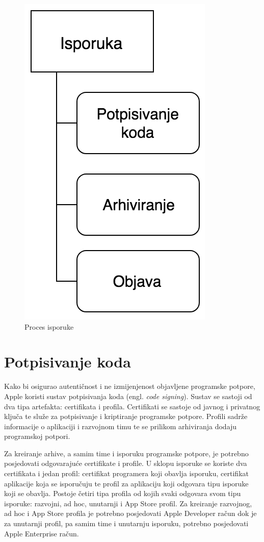 \documentclass[times, utf8, diplomski, numeric]{fer}
\newcommand{\eng}[1]{(engl. \textit{#1})}
\begin{document}
\begin{figure}
\centering
\includegraphics[scale=0.6]{ContinuousDelivery}
\caption{Proces isporuke}
\label{fig:ContinuousDelivery}
\end{figure}

\section{Potpisivanje koda} \label{header:PotpisivanjeKoda}

Kako bi osigurao autentičnost i ne izmijenjenost objavljene programske potpore, Apple koristi sustav potpisivanja koda \eng{code signing}. Sustav se sastoji od dva tipa artefakta: certifikata i profila. Certifikati se sastoje od javnog i privatnog ključa te služe za potpisivanje i kriptiranje programske potpore. Profili sadrže informacije o aplikaciji i razvojnom timu te se prilikom arhiviranja dodaju programskoj potpori.

Za kreiranje arhive, a samim time i isporuku programske potpore, je potrebno posjedovati odgovarajuće certifikate i profile. U sklopu isporuke se koriste dva certifikata i jedan profil: certifikat programera koji obavlja isporuku, certifikat aplikacije koja se isporučuju te profil za aplikaciju koji odgovara tipu isporuke koji se obavlja\citep{codesigning}. Postoje četiri tipa profila od kojih svaki odgovara svom tipu isporuke: razvojni, ad hoc, unutarnji i App Store profil. Za kreiranje razvojnog, ad hoc i App Store profila je potrebno posjedovati Apple Developer račun dok je za unutarnji profil, pa samim time i unutarnju isporuku, potrebno posjedovati Apple Enterprise račun.
\end{document}
